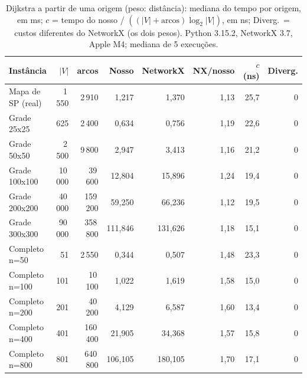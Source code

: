 \begin{table}[ht]
\centering
\caption{Dijkstra a partir de uma origem (peso: distância): mediana do tempo por origem, em ms; $c$ = tempo do nosso / $((|V| + \text{arcos}) \log_2 |V|)$, em ns; Diverg.\ = custos diferentes do NetworkX (os dois pesos). Python 3.15.2, NetworkX 3.7, Apple M4; mediana de 5 execuções.}
\label{tab:dijkstra-networkx}
\begin{tabular}{lrrrrrrr}
\toprule
Instância & $|V|$ & arcos & Nosso & NetworkX & NX/nosso & $c$ (ns) & Diverg. \\
\midrule
Mapa de SP (real) & 1\,550 & 2\,910 & 1{,}217 & 1{,}370 & 1{,}13 & 25{,}7 & 0 \\
\midrule
Grade 25x25 & 625 & 2\,400 & 0{,}634 & 0{,}756 & 1{,}19 & 22{,}6 & 0 \\
Grade 50x50 & 2\,500 & 9\,800 & 2{,}947 & 3{,}413 & 1{,}16 & 21{,}2 & 0 \\
Grade 100x100 & 10\,000 & 39\,600 & 12{,}804 & 15{,}896 & 1{,}24 & 19{,}4 & 0 \\
Grade 200x200 & 40\,000 & 159\,200 & 59{,}250 & 66{,}236 & 1{,}12 & 19{,}5 & 0 \\
Grade 300x300 & 90\,000 & 358\,800 & 111{,}846 & 131{,}626 & 1{,}18 & 15{,}1 & 0 \\
\midrule
Completo n=50 & 51 & 2\,550 & 0{,}344 & 0{,}507 & 1{,}48 & 23{,}3 & 0 \\
Completo n=100 & 101 & 10\,100 & 1{,}022 & 1{,}619 & 1{,}58 & 15{,}0 & 0 \\
Completo n=200 & 201 & 40\,200 & 4{,}129 & 6{,}587 & 1{,}60 & 13{,}4 & 0 \\
Completo n=400 & 401 & 160\,400 & 21{,}905 & 34{,}368 & 1{,}57 & 15{,}8 & 0 \\
Completo n=800 & 801 & 640\,800 & 106{,}105 & 180{,}105 & 1{,}70 & 17{,}1 & 0 \\
\bottomrule
\end{tabular}
\end{table}
